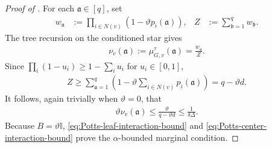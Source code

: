 \documentclass[a4paper,12pt]{article}
\theoremstyle{plain}
\theoremstyle{definition}
\def\!#1{\mathfrak{#1}} %
\def\!#1{\mathfrak{#1}} %
\newcommand{\tuple}[1]{\left(#1\right)}
\newcommand{\tp}{\tuple}
\begin{document}
\begin{proof}[Proof of ]
For each $\!a\in[q]$, set
\begin{align*}
  w_{\!a}
  &:=%
  \prod_{i\in N(v)}\tp{1-\vartheta p_i(\!a)},
  &
  Z&:=\sum_{\!b=1}^q w_{\!b}.
\end{align*}
The tree recursion on the conditioned star gives
\begin{align*}
  \nu_v(\!a)
  :=
  \mu^\tau_{G,v}(\!a)
  =
  \frac{w_{\!a}}Z.
\end{align*}
Since $\prod_i(1-u_i)\geq1-\sum_i u_i$ for $u_i\in[0,1]$,
\begin{align*}
  Z
  \geq
  \sum_{\!a=1}^q\tp{1-\vartheta\sum_{i\in N(v)}p_i(\!a)}
  =q-\vartheta d.
\end{align*}
It follows, again trivially when $\vartheta=0$, that
\begin{align}
  \vartheta\nu_v(\!a)
  \leq
  \frac{\vartheta}{q-\vartheta d}
  \leq
  \frac1{\delta\Delta}.
  \label{eq:Potts-center-interaction-bound}
\end{align}
Because $B=\vartheta\mathbb I$, \eqref{eq:Potts-leaf-interaction-bound}
and \eqref{eq:Potts-center-interaction-bound} prove the
$\alpha$-bounded marginal condition.


\end{proof}
\end{document}
